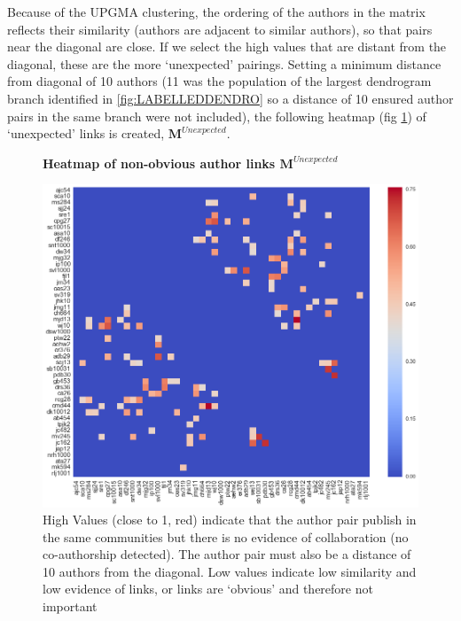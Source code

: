 Because of the UPGMA clustering, the ordering of the authors in the matrix reflects their similarity (authors are adjacent to similar authors), so that pairs near the diagonal are close. If we select the high values that are distant from the diagonal, these are the more `unexpected' pairings. Setting a minimum distance from diagonal of 10 authors (11 was the population of the largest dendrogram branch identified in \ref{fig:LABELLEDDENDRO} so a distance of 10 ensured author pairs in the same branch were not included), the following heatmap (fig \ref{fig:unexpected_links}) of `unexpected' links is created, $\mathbf{M}^{Unexpected}$.
\newpage
\addtocounter{page}{-2}
\begin{figure}[H]
    \centering
    \textbf{Heatmap of non-obvious author links $\mathbf{M}^{Unexpected}$}\par\medskip
    \includegraphics[width=\textwidth]{Appendix/Neonicotinoids/Unexpected_Heatmap.png}
    \caption[Heatmap of Non-Obvious Author Links $\mathbf{M}^{Unexpected}$]{High Values (close to 1, red) indicate that the author pair publish in the same communities but there is no evidence of collaboration (no co-authorship detected). The author pair must also be a distance of 10 authors from the diagonal. Low values indicate low similarity and low evidence of links, or links are `obvious' and therefore not important}
     \label{fig:unexpected_links}
\end{figure}
\newpage
\addtocounter{page}{1}
